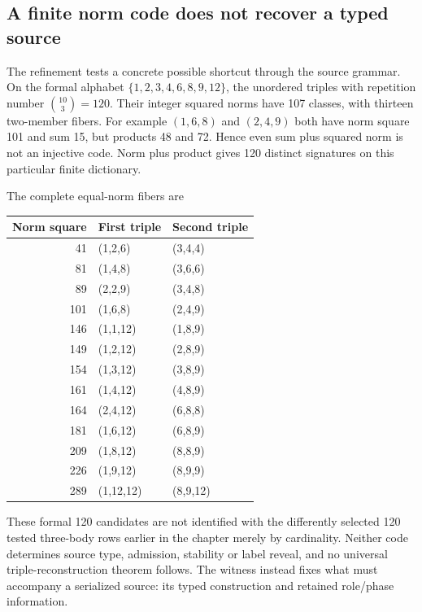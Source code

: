 \subsection{A finite norm code does not recover a typed source}
\label{sec:grammar-fibers-12}

The refinement tests a concrete possible shortcut through the source
grammar. On the formal alphabet $\{1,2,3,4,6,8,9,12\}$, the unordered
triples with repetition number $\binom{10}{3}=120$. Their integer squared
norms have 107 classes, with thirteen two-member fibers. For example
$(1,6,8)$ and $(2,4,9)$ both have norm square 101 and sum 15, but products
48 and 72. Hence even sum plus squared norm is not an injective code.
Norm plus product gives 120 distinct signatures on this particular finite
dictionary.

The complete equal-norm fibers are
\begin{center}\small
\begin{tabular}{rll}\toprule
Norm square&First triple&Second triple\\\midrule
41&(1,2,6)&(3,4,4)\\81&(1,4,8)&(3,6,6)\\
89&(2,2,9)&(3,4,8)\\101&(1,6,8)&(2,4,9)\\
146&(1,1,12)&(1,8,9)\\149&(1,2,12)&(2,8,9)\\
154&(1,3,12)&(3,8,9)\\161&(1,4,12)&(4,8,9)\\
164&(2,4,12)&(6,8,8)\\181&(1,6,12)&(6,8,9)\\
209&(1,8,12)&(8,8,9)\\226&(1,9,12)&(8,9,9)\\
289&(1,12,12)&(8,9,12)\\\bottomrule
\end{tabular}
\end{center}
These formal 120 candidates are not identified with the differently
selected 120 tested three-body rows earlier in the chapter merely by
cardinality. Neither code determines source type, admission, stability
or label reveal, and no universal triple-reconstruction theorem follows.
The witness instead fixes what must accompany a serialized source: its
typed construction and retained role/phase information.
